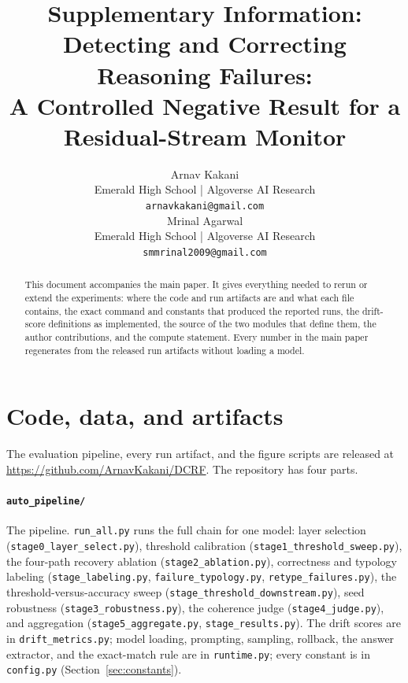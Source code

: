 \documentclass{article}
\title{Supplementary Information:\\Detecting and Correcting Reasoning Failures:\\A Controlled Negative Result for a Residual-Stream Monitor}
\author{%
  Arnav Kakani \\
  Emerald High School | Algoverse AI Research\\
  \texttt{arnavkakani@gmail.com} \\
  \And
  Mrinal Agarwal \\
  Emerald High School | Algoverse AI Research\\
  \texttt{smmrinal2009@gmail.com}
}
\begin{document}
\maketitle

\begin{abstract}
This document accompanies the main paper. It gives everything needed to rerun or extend the experiments: where the code and run artifacts are and what each file contains, the exact command and constants that produced the reported runs, the drift-score definitions as implemented, the source of the two modules that define them, the author contributions, and the compute statement. Every number in the main paper regenerates from the released run artifacts without loading a model.
\end{abstract}

\section{Code, data, and artifacts}
The evaluation pipeline, every run artifact, and the figure scripts are released at \url{https://github.com/ArnavKakani/DCRF}. The repository has four parts.

\paragraph{\texttt{auto\_pipeline/}} The pipeline. \texttt{run\_all.py} runs the full chain for one model: layer selection (\texttt{stage0\_layer\_select.py}), threshold calibration (\texttt{stage1\_threshold\_sweep.py}), the four-path recovery ablation (\texttt{stage2\_ablation.py}), correctness and typology labeling (\texttt{stage\_labeling.py}, \texttt{failure\_typology.py}, \texttt{retype\_failures.py}), the threshold-versus-accuracy sweep (\texttt{stage\_threshold\_downstream.py}), seed robustness (\texttt{stage3\_robustness.py}), the coherence judge (\texttt{stage4\_judge.py}), and aggregation (\texttt{stage5\_aggregate.py}, \texttt{stage\_results.py}). The drift scores are in \texttt{drift\_metrics.py}; model loading, prompting, sampling, rollback, the answer extractor, and the exact-match rule are in \texttt{runtime.py}; every constant is in \texttt{config.py} (Section~\ref{sec:constants}).
\end{document}
